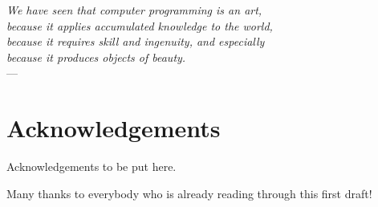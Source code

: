 
\begin{flushright}{\slshape
    We have seen that computer programming is an art, \\
    because it applies accumulated knowledge to the world, \\
    because it requires skill and ingenuity, and especially \\
    because it produces objects of beauty.} \\ \medskip
    ---  \citep{knuth:1974}
\end{flushright}



\bigskip

\begingroup
\let\clearpage\relax
\let\cleardoublepage\relax
\let\cleardoublepage\relax
\chapter*{Acknowledgements}
Acknowledgements  to be put here.
\vspace*{10cm}


Many thanks to everybody who is already reading through this first draft!


\bigskip



\endgroup
